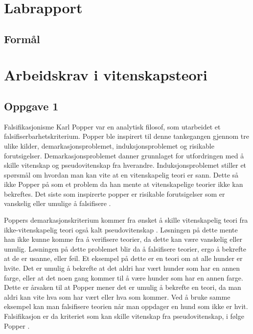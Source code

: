 \documentclass[
]{book}
\begin{document}
\hypertarget{labrapport}{%
\chapter{Labrapport}\label{labrapport}}

\hypertarget{formuxe5l}{%
\section{Formål}\label{formuxe5l}}

\hypertarget{arbeidskrav-i-vitenskapsteori}{%
\chapter{Arbeidskrav i vitenskapsteori}\label{arbeidskrav-i-vitenskapsteori}}

\hypertarget{oppgave-1}{%
\section{Oppgave 1}\label{oppgave-1}}

Falsifikasjonisme Karl Popper var en analytisk filosof, som utarbeidet et falsifiserbarhetskriterium. Popper ble inspirert til denne tankegangen gjennom tre ulike kilder, demarkasjonsproblemet, induksjonsproblemet og risikable forutsigelser. Demarkasjonsproblemet danner grunnlaget for utfordringen med å skille vitenskap og pseudovitenskap fra hverandre. Induksjonsproblemet stiller et spørsmål om hvordan man kan vite at en vitenskapelig teori er sann. Dette så ikke Popper på som et problem da han mente at vitenskapelige teorier ikke kan bekreftes. Det siste som inspirerte popper er risikable forutsigelser som er vanskelig eller umulige å falsifisere \citep{alnes2018}.

Poppers demarkasjonskriterium kommer fra ønsket å skille vitenskapelig teori fra ikke-vitenskapelig teori også kalt pseudovitenskap \citep{dellsén2021}. Løsningen på dette mente han ikke kunne komme fra å verifisere teorier, da dette kan være vanskelig eller umulig. Løsningen på dette problemet blir da å falsifisere teorier, ergo å bekrefte at de er usanne, eller feil. Et eksempel på dette er en teori om at alle hunder er hvite. Det er umulig å bekrefte at det aldri har vært hunder som har en annen farge, eller at det noen gang kommer til å være hunder som har en annen farge. Dette er årsaken til at Popper mener det er umulig å bekrefte en teori, da man aldri kan vite hva som har vært eller hva som kommer. Ved å bruke samme eksempel kan man falsifisere teorien når man oppdager en hund som ikke er hvit. Falsifikasjon er da kriteriet som kan skille vitenskap fra pseudovitenskap, i følge Popper \citep{okasha2016}.
\end{document}
